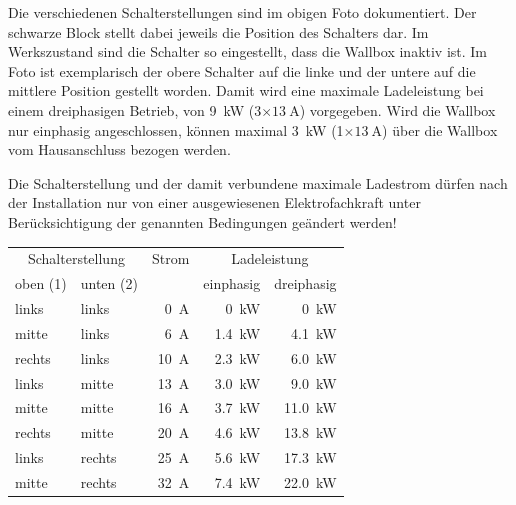\documentclass[a4paper,10pt]{article}
\newcommand{\hint}[1]{\begin{tcolorbox}[colback=boxgray,colframe=black,coltext=
white,title=Hinweis,left*=2mm,right*=2mm,boxsep=1mm,bottom=1mm,top=1mm]#1\end{tcolorbox}}
\begin{document}
\begin{multicols*}{2}
	Die verschiedenen Schalterstellungen sind im obigen Foto dokumentiert.
	Der schwarze Block stellt dabei jeweils die Position
	des Schalters dar. Im Werkszustand sind die Schalter so eingestellt,
	dass die Wallbox inaktiv ist. Im Foto ist exemplarisch der obere
	Schalter auf die linke und der untere auf die mittlere Position gestellt
	worden. Damit wird eine maximale Ladeleistung bei einem dreiphasigen
	Betrieb, von \SI{9}{\kilo\watt} (3$\times\SI{13}{\ampere}$) vorgegeben.
	Wird die Wallbox nur einphasig angeschlossen, können maximal
	\SI{3}{\kilo\watt} (1$\times\SI{13}{\ampere}$) über die Wallbox vom Hausanschluss
	bezogen werden.

	\hint{Die Schalterstellung und der damit verbundene maximale Ladestrom dürfen nach der
	      Installation nur von einer ausgewiesenen Elektrofachkraft unter
	      Berücksichtigung der genannten Bedingungen geändert werden!}

	\begin{tabular}{lp{}rrr}
		\toprule
		\multicolumn{2}{c}{Schalterstellung} & Strom            & \multicolumn{2}{c}{Ladeleistung}             \\
		\small{oben (1)} & \small{unten (2)} &                  & \small{einphasig}    & \small{dreiphasig}    \\
		\midrule
		links            & links             & \SI{0}{\ampere}  & \SI{0}{\kilo\watt}   & \SI{0}{\kilo\watt}    \\
		mitte            & links             & \SI{6}{\ampere}  & \SI{1.4}{\kilo\watt} & \SI{4.1}{\kilo\watt}  \\
		rechts           & links             & \SI{10}{\ampere} & \SI{2.3}{\kilo\watt} & \SI{6.0}{\kilo\watt}  \\
		links            & mitte             & \SI{13}{\ampere} & \SI{3.0}{\kilo\watt} & \SI{9.0}{\kilo\watt}  \\
		mitte            & mitte             & \SI{16}{\ampere} & \SI{3.7}{\kilo\watt} & \SI{11.0}{\kilo\watt} \\
		rechts           & mitte             & \SI{20}{\ampere} & \SI{4.6}{\kilo\watt} & \SI{13.8}{\kilo\watt} \\
		links            & rechts            & \SI{25}{\ampere} & \SI{5.6}{\kilo\watt} & \SI{17.3}{\kilo\watt} \\
		mitte            & rechts            & \SI{32}{\ampere} & \SI{7.4}{\kilo\watt} & \SI{22.0}{\kilo\watt} \\
		\bottomrule
	\end{tabular}


\end{multicols*}
\end{document}
